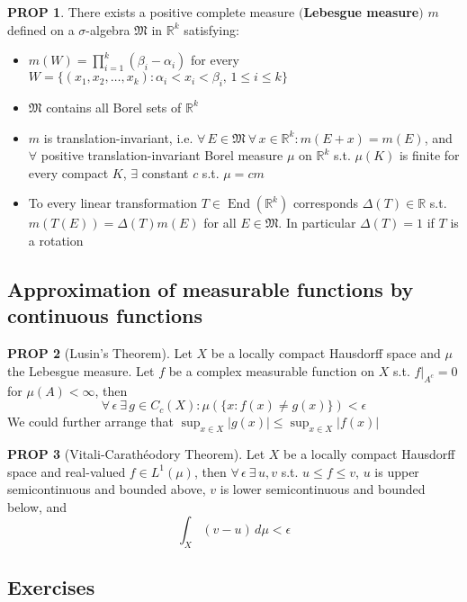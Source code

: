 \documentclass[hidelinks,10pt]{article}
\theoremstyle{definition}
\theoremstyle{dotles}
\theoremstyle{dotless}
\newtheorem{proposition}{PROP}[section]
\theoremstyle{remark}
\DeclareMathOperator{\End}{End}
\begin{document}
\begin{proposition}There exists a positive complete measure $($\textbf{Lebesgue measure}$)$ $m$ defined on a $\sigma$-algebra $\mathfrak{M}$ in $\mathbb{R}^k$ satisfying:\begin{itemize}
    \item $m(W)=\prod_{i=1}^k(\beta_i-\alpha_i)$ for every $W=\{(x_1,x_2,\dots,x_k):\alpha_i<x_i<\beta_i,\,1\leq i\leq k\}$
    \item $\mathfrak{M}$ contains all Borel sets of $\mathbb{R}^k$
    \item $m$ is translation-invariant, i.e. $\forall\,E\in\mathfrak{M}\ \forall\, x\in\mathbb{R}^k:m(E+x)=m(E)$, and $\forall$ positive translation-invariant Borel measure $\mu$ on $\mathbb{R}^k$ s.t. $\mu(K)$ is finite for every compact $K$, $\exists$ constant $c$ s.t. $\mu=cm$
    \item To every linear transformation $T\in\End(\mathbb{R}^k)$ corresponds $\Delta(T)\in\mathbb{R}$ s.t. $m(T(E))=\Delta(T)m(E)$ for all $E\in\mathfrak{M}$. In particular $\Delta(T)=1$ if $T$ is a rotation
\end{itemize}
\end{proposition}

\subsection{Approximation of measurable functions by continuous functions}

\begin{proposition}[Lusin's Theorem]Let $X$ be a locally compact Hausdorff space and $\mu$ the Lebesgue measure. Let $f$ be a complex measurable function on $X$ s.t. $f|_{A^c}=0$ for $\mu(A)<\infty$, then
\[\forall\,\epsilon\ \exists\,g\in C_c(X):\mu(\{x:f(x)\neq g(x)\})<\epsilon\]
We could further arrange that $\sup_{x\in X}|g(x)|\leq\sup_{x\in X}|f(x)|$
\end{proposition}

\begin{proposition}[Vitali-Carathéodory Theorem]Let $X$ be a locally compact Hausdorff space and real-valued $f\in L^1(\mu)$, then $\forall\,\epsilon\ \exists\,u,v$ s.t. $u\leq f\leq v$, $u$ is upper semicontinuous and bounded above, $v$ is lower semicontinuous and bounded below, and
\[\int_X(v-u)\,d\mu<\epsilon\]
\end{proposition}

\subsection*{Exercises}
\end{document}
